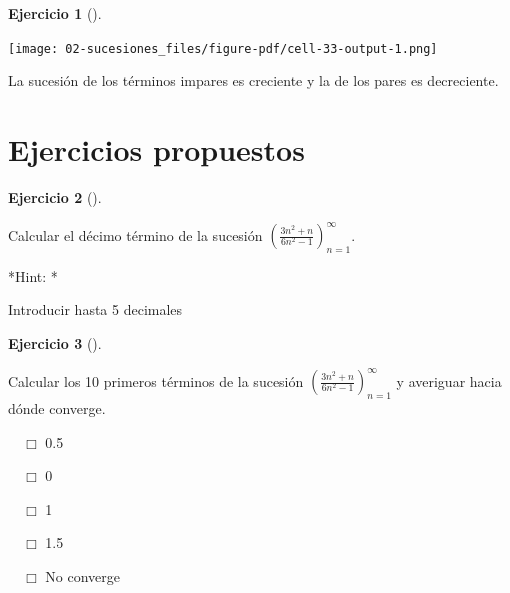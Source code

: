 \documentclass[
  a4paper,
]{scrreport}
\newenvironment{Shaded}{\begin{snugshade}}{\end{snugshade}}
\newcommand{\BuiltInTok}[1]{\textcolor[rgb]{0.00,0.23,0.31}{#1}}
\newcommand{\FloatTok}[1]{\textcolor[rgb]{0.68,0.00,0.00}{#1}}
\newcommand{\FunctionTok}[1]{\textcolor[rgb]{0.28,0.35,0.67}{#1}}
\newcommand{\ImportTok}[1]{\textcolor[rgb]{0.00,0.46,0.62}{#1}}
\newcommand{\NormalTok}[1]{\textcolor[rgb]{0.00,0.23,0.31}{#1}}
\newcommand{\OperatorTok}[1]{\textcolor[rgb]{0.37,0.37,0.37}{#1}}
\newcommand{\SpecialCharTok}[1]{\textcolor[rgb]{0.37,0.37,0.37}{#1}}
\newcommand{\StringTok}[1]{\textcolor[rgb]{0.13,0.47,0.30}{#1}}
\theoremstyle{definition}
\newtheorem{exercise}{Ejercicio}[chapter]
\theoremstyle{remark}
\begin{document}
\begin{exercise}[]
\begin{enumerate}
\begin{tcolorbox}
\begin{Shaded}
\end{Shaded}

  \texttt{[image: 02-sucesiones\_files/figure-pdf/cell-33-output-1.png]}

  La sucesión de los términos impares es creciente y la de los pares es
  decreciente.

  \end{tcolorbox}
\end{enumerate}

\end{exercise}

\section{Ejercicios propuestos}\label{ejercicios-propuestos}

\begin{exercise}[]\protect\hypertarget{exr-sucesiones-propuesto-1}{}\label{exr-sucesiones-propuesto-1}

Calcular el décimo término de la sucesión
\(\left(\frac{3n^2+n}{6n^2-1}\right)_{n=1}^\infty\).

\vspace{18pt}*Hint: *

Introducir hasta 5 decimales

\end{exercise}

\begin{exercise}[]\protect\hypertarget{exr-sucesiones-propuesto-2}{}\label{exr-sucesiones-propuesto-2}

Calcular los 10 primeros términos de la sucesión
\(\left(\frac{3n^2+n}{6n^2-1}\right)_{n=1}^\infty\) y averiguar hacia
dónde converge.

${\quad\Box}$ 0.5

${\quad\Box}$ 0

${\quad\Box}$ 1

${\quad\Box}$ 1.5

${\quad\Box}$ No converge

\end{exercise}
\end{document}
